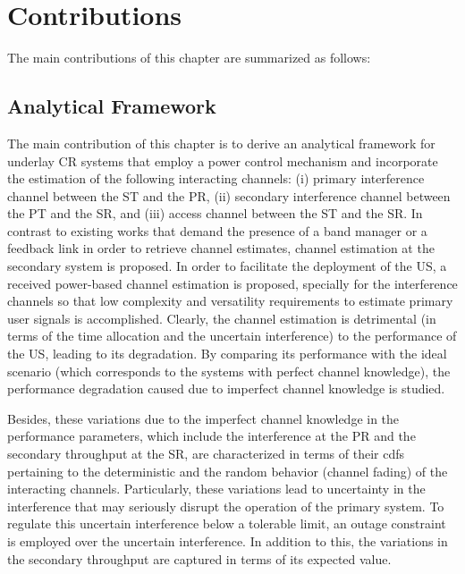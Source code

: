 \section{Contributions}
The main contributions of this chapter are summarized as follows: 
\subsection{Analytical Framework}
The main contribution of this chapter is to derive an analytical framework for underlay CR systems that employ a power control mechanism and incorporate the estimation of the following interacting channels: (i) primary interference channel between the ST and the PR, (ii) secondary interference channel between the PT and the SR, and (iii) access channel between the ST and the SR. In contrast to existing works that demand the presence of a band manager or a feedback link in order to retrieve channel estimates, channel estimation at the secondary system is proposed. In order to facilitate the deployment of the US, a received power-based channel estimation is proposed, specially for the interference channels so that low complexity and versatility requirements to estimate primary user signals is accomplished. Clearly, the channel estimation is detrimental (in terms of the time allocation and the uncertain interference) to the performance of the US, leading to its degradation. By comparing its performance with the ideal scenario (which corresponds to the systems with perfect channel knowledge), the performance degradation caused due to imperfect channel knowledge is studied. 

Besides, these variations due to the imperfect channel knowledge in the performance parameters, which include the interference at the PR and the secondary throughput at the SR, are characterized in terms of their cdfs pertaining to the deterministic  and the random behavior (channel fading) of the interacting channels. Particularly, these variations lead to uncertainty in the interference that may seriously disrupt the operation of the primary system. To regulate this uncertain interference below a tolerable limit, an outage constraint is employed over the uncertain interference. In addition to this, the variations in the secondary throughput are captured in terms of its expected value.

